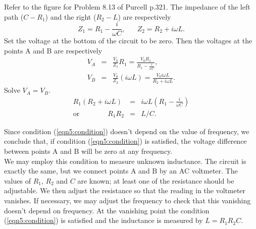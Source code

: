 \documentclass[makesolutionspdf]{esg8022pset}
\begin{document}
\begin{solution}
Refer to the figure for Problem 8.13 of Purcell p.321.  The impedance
of the left path ($C-R_1$) and the right ($R_2 - L$) are respectively
\[Z_1=R_1-\frac{i}{\omega C},\;\;\;\;\;\; Z_2=R_2+i\omega L.\]
Set the voltage at the bottom of the circuit to be zero.  Then the
voltages at the points A and B are respectively
\begin{eqnarray}
V_A &=& \frac{V_0}{Z_1} R_1= \frac{V_0 R_1}{R_1-\frac{i}{\omega
C}},\nonumber\\
V_B &=& \frac{V_0}{Z_2} (i\omega L)=\frac{V_0 i\omega L}{R_2+i\omega L}.
\end{eqnarray}
Solve $V_A=V_B$.
\begin{eqnarray}
R_1(R_2+i\omega L) &=& i\omega L (R_1-\frac{i}{\omega C})\nonumber\\
\textrm{or}\qquad\qquad R_1 R_2 &=& L/C.\label{eqn5:condition}
\end{eqnarray}

Since condition (\ref{eqn5:condition}) doesn't depend on the value of
frequency, we conclude that, if condition (\ref{eqn5:condition}) is
satisfied, the voltage difference between points A and B will be zero
at any frequency.\\

We may employ this condition to measure unknown inductance.  The
circuit is exactly the same, but we connect points A and B by an AC
voltmeter.  The values of $R_1$, $R_2$ and $C$ are known; at least one
of the resistance should be adjustable.  We then adjust the resistance
so that the reading in the voltmeter vanishes.  If necessary, we may
adjust the frequency to check that this vanishing doesn't depend on
frequency.  At the vanishing point the condition
(\ref{eqn5:condition}) is satisfied and the inductance is measured by
$L=R_1 R_2 C$.

\end{solution}
\end{document}

